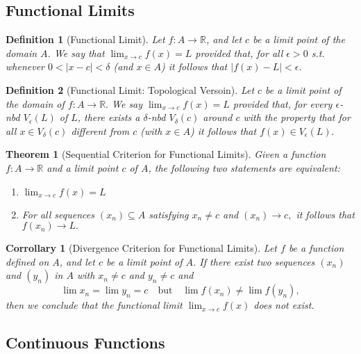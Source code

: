 \documentclass[10pt]{article}
\newtheorem{theorem}{Theorem}[section]
\newtheorem{definition}{Definition}[section]
\newtheorem{corollary}{Corrollary}[section]
\begin{document}
\subsection{Functional Limits}

\begin{definition}[Functional Limit]
    Let $f:A\to\mathbb{R}$, and let $c$ be a limit point of the domain $A$. We say that $\lim_{x\to c}f(x)=L$ provided that, for all $\epsilon>0$ s.t. whenever $0<|x-c|<\delta$ (and $x\in A$) it follows that $|f(x)-L|<\epsilon.$
\end{definition}

\begin{definition}[Functional Limit: Topological Versoin]
    Let $c$ be a limit point of the domain of $f:A\to\mathbb{R}.$ We say $\lim_{x\to c}f(x)=L$ provided that, for every $\epsilon$-nbd $V_\epsilon(L)$ of $L$, there exists a $\delta$-nbd $V_\delta(c)$ around $c$ with the property that for all $x\in V_\delta(c)$ different from $c$ (with $x\in A$) it follows that $f(x)\in V_\epsilon(L).$
\end{definition}

\begin{theorem}[Sequential Criterion for Functional Limits]
    Given a function $f:A\to\mathbb{R}$ and a limit point $c$ of $A$, the following two statements are equivalent:\begin{enumerate}
        \item $\lim_{x\to c}f(x)=L$
        \item For all sequences $(x_n)\subseteq A$ satisfying $x_n\neq c$ and $(x_n)\to c,$ it follows that $f(x_n)\to L.$
    \end{enumerate}
\end{theorem}

\begin{corollary}[Divergence Criterion for Functional Limits]
    Let $f$ be a function defined on $A$, and let $c$ be a limit point of $A$. If there exist two sequences $(x_n)$ and $(y_n)$ in $A$ with $x_n\neq c$ and $y_n\neq c$ and
    \[\lim x_n=\lim y_n=c\quad\text{but}\quad\lim f(x_n)\neq \lim f(y_n),\]
    then we conclude that the functional limit $\lim_{x\to c}f(x)$ does not exist.
\end{corollary}

\subsection{Continuous Functions}
\end{document}
